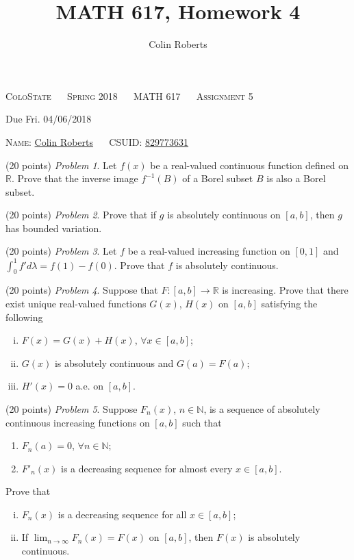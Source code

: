 \documentclass[leqno]{article}
\author{Colin Roberts}
\title{MATH 617, Homework 4}
\theoremstyle{nonumberplain}
\newcommand{\R}{\mathbb{R}}
\newcommand{\N}{\mathbb{N}}
\begin{document}
\begin{center}
  \textsc{\large ColoState ~~ Spring 2018 ~~ MATH 617 ~~ Assignment 5}
\end{center}

\begin{center}
  \textrm{Due Fri. 04/06/2018}
\end{center}

\vglue 0.10in

\bigskip
\noindent
\textsc{Name:} \underline{Colin Roberts\hglue 1.5in} ~~
\textsc{CSUID:} \underline{829773631\hglue 1.5in}

\vskip 0.15in

\bigskip
\noindent
(20 points) \textit{Problem 1}. \quad
Let $f(x)$ be a real-valued continuous function defined on $\R$. Prove that the inverse image $f^{-1}(B)$ of a Borel subset $B$ is also a Borel subset.

\bigskip
\bigskip
\noindent
(20 points) \textit{Problem 2}. \quad
Prove that if $g$ is absolutely continuous on $[a,b]$, then $g$ has bounded variation.

\bigskip
\bigskip
\noindent
(20 points) \textit{Problem 3}. \quad
Let $f$ be a real-valued increasing function on $[0,1]$ and $\int_0^1 f'd\lambda = f(1)-f(0)$. Prove that $f$ is absolutely continuous.

\bigskip
\bigskip
\noindent
(20 points) \textit{Problem 4}. \quad
Suppose that $F\colon [a,b] \to \R$ is increasing. Prove that there exist unique real-valued functions $G(x)$, $H(x)$ on $[a,b]$ satisfying the following
\begin{enumerate}[(i)]
\item $F(x)=G(x)+H(x)$, $\forall x \in [a,b]$;
\item $G(x)$ is absolutely continuous and $G(a)=F(a)$;
\item $H'(x)=0$ a.e. on $[a,b]$.
\end{enumerate}

\bigskip
\bigskip
\noindent
(20 points) \textit{Problem 5}. \quad
Suppose $F_n(x)$, $n\in \N$, is a sequence of absolutely continuous increasing functions on $[a,b]$ such that
\begin{enumerate}[(1)]
\item $F_n(a)=0$, $\forall n \in \N$;
\item $F'_n(x)$ is a decreasing sequence for almost every $x\in [a,b]$.
\end{enumerate}
Prove that
\begin{enumerate}[(i)]
\item $F_n(x)$ is a decreasing sequence for all $x \in [a,b]$;
\item If $\displaystyle{\lim_{n\to \infty} F_n(x)=F(x)}$ on $[a,b]$, then $F(x)$ is absolutely continuous.
\end{enumerate}
\end{document}
